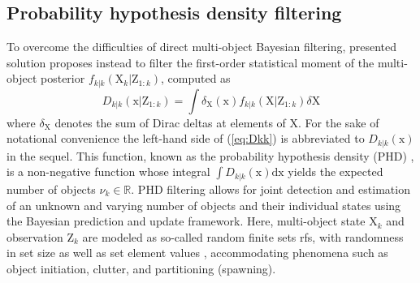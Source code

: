\subsection{Probability hypothesis density filtering}
\label{ch3:ssec:prob-hyp-den}
To overcome the difficulties of direct multi-object Bayesian filtering, presented solution proposes instead to filter the first-order statistical moment of the multi-object posterior $f_{k|k}(\mathrm{X}_{k}|\mathrm{Z}_{1:k})$, computed as
\begin{equation}
D_{k|k}(\mathrm{x}|\mathrm{Z}_{1:k}) = \int\!\delta_{\mathrm{X}}(\mathrm{x})f_{k|k}(\mathrm{X}|\mathrm{Z}_{1:k})\delta\mathrm{X}
\label{eq:Dkk}
\end{equation}
where $\delta_{\mathrm{X}}$ denotes the sum of Dirac deltas at elements of $\mathrm{X}$. For the sake of notational convenience the left-hand side of (\ref{eq:Dkk}) is abbreviated to $D_{k|k}(\mathrm{x})$ in the sequel. This function, known as the probability hypothesis density (PHD) \cite{mahler2003multitarget}, is a non-negative function whose integral $\int\!D_{k|k}(\mathrm{x})\mathrm{d}\mathrm{x}$ yields the expected number of objects $\nu_{k}\in\mathbb{R}$. PHD filtering allows for joint detection and estimation of an unknown and varying number of objects and their individual states using the Bayesian prediction and update framework. Here, multi-object state $\mathrm{X}_k$ and observation $\mathrm{Z}_k$ are modeled as so-called random finite sets \gls{rfs}, with randomness in set size as well as set element values \cite{bar1995multitarget}, accommodating phenomena such as object initiation, clutter, and partitioning (spawning). 

